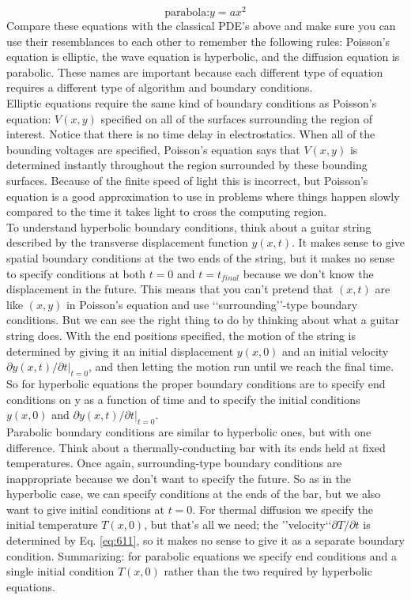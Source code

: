 \begin{equation}\label{eq:614}
\text{parabola:} y=a x^{2}
\end{equation}
Compare these equations with the classical PDE\rq s above and make sure you can use their resemblances to each other to remember the following rules: Poisson\rq s equation is elliptic, the wave equation is hyperbolic, and the diffusion equation is parabolic. These names are important because each different type of equation requires a different type of algorithm and boundary conditions. \\  Elliptic equations require the same kind of boundary conditions as Poisson\rq s equation: $V (x, y)$ specified on all of the surfaces surrounding the region of interest. Notice that there is no time delay in electrostatics. When all of the bounding voltages are specified, Poisson\rq s equation says that $V(x, y)$ is determined instantly throughout the region surrounded by these bounding surfaces. Because of the finite speed of light this is incorrect, but Poisson\rq s equation is a good approximation to use in problems where things happen slowly compared to the time it takes light to cross the computing region. \\
To understand hyperbolic boundary conditions, think about a guitar string
described by the transverse displacement function $y(x,t)$. It makes sense to
give spatial boundary conditions at the two ends of the string, but it makes no
sense to specify conditions at both $t = 0$ and $t = t_{final}$ because we don\rq t know the
displacement in the future. This means that you can\rq t pretend that $(x,t)$ are like
$(x, y)$ in Poisson\rq s equation and use \lq\lq surrounding\rq\rq -type boundary conditions. But
we can see the right thing to do by thinking about what a guitar string does. With
the end positions specified, the motion of the string is determined by giving it an
initial displacement $y(x,0)$ and an initial velocity $\partial y(x,t)/ \partial t\vert_{t=0}$, and then letting
the motion run until we reach the final time. So for hyperbolic equations the
proper boundary conditions are to specify end conditions on y as a function of
time and to specify the initial conditions $y(x,0)$ and $\partial y(x,t)/ \partial t\vert_{t=0}$. \\

Parabolic boundary conditions are similar to hyperbolic ones, but with one difference. Think about a thermally-conducting bar with its ends held at fixed
temperatures. Once again, surrounding-type boundary conditions are inappropriate because we don\rq t want to specify the future. So as in the hyperbolic case,
we can specify conditions at the ends of the bar, but we also want to give initial conditions at $t = 0$. For thermal diffusion we specify the initial temperature
$T (x,0)$, but that\rq s all we need; the \rq\rq velocity\lq\lq $\partial T / \partial t$ is determined by Eq. \eqref{eq:611},
so it makes no sense to give it as a separate boundary condition. Summarizing:
for parabolic equations we specify end conditions and a single initial condition
$T (x,0)$ rather than the two required by hyperbolic equations. \\ 

